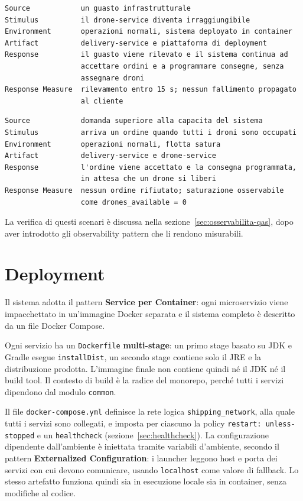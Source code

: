 \documentclass[12pt,a4paper]{article}
\begin{document}
\begin{lstlisting}[caption={QAS-A, Availability: guasto di un servizio a valle}]
Source            un guasto infrastrutturale
Stimulus          il drone-service diventa irraggiungibile
Environment       operazioni normali, sistema deployato in container
Artifact          delivery-service e piattaforma di deployment
Response          il guasto viene rilevato e il sistema continua ad
                  accettare ordini e a programmare consegne, senza
                  assegnare droni
Response Measure  rilevamento entro 15 s; nessun fallimento propagato
                  al cliente
\end{lstlisting}

\begin{lstlisting}[caption={QAS-B, Saturazione: flotta di droni esaurita}]
Source            domanda superiore alla capacita del sistema
Stimulus          arriva un ordine quando tutti i droni sono occupati
Environment       operazioni normali, flotta satura
Artifact          delivery-service e drone-service
Response          l'ordine viene accettato e la consegna programmata,
                  in attesa che un drone si liberi
Response Measure  nessun ordine rifiutato; saturazione osservabile
                  come drones_available = 0
\end{lstlisting}

La verifica di questi scenari \`e discussa nella sezione~\ref{sec:osservabilita-qas}, dopo aver
introdotto gli observability pattern che li rendono misurabili.

\section{Deployment}

Il sistema adotta il pattern \textbf{Service per Container}: ogni microservizio viene impacchettato
in un'immagine Docker separata e il sistema completo \`e descritto da un file Docker Compose.

Ogni servizio ha un \texttt{Dockerfile} \textbf{multi-stage}: un primo stage basato su JDK e Gradle
esegue \texttt{installDist}, un secondo stage contiene solo il JRE e la distribuzione prodotta.
L'immagine finale non contiene quindi n\'e il JDK n\'e il build tool. Il contesto di build \`e la
radice del monorepo, perch\'e tutti i servizi dipendono dal modulo \texttt{common}.

Il file \texttt{docker-compose.yml} definisce la rete logica \texttt{shipping\_network}, alla quale
tutti i servizi sono collegati, e imposta per ciascuno la policy \texttt{restart: unless-stopped} e
un \texttt{healthcheck} (sezione~\ref{sec:healthcheck}). La configurazione dipendente dall'ambiente
\`e iniettata tramite variabili d'ambiente, secondo il pattern \textbf{Externalized Configuration}:
i launcher leggono host e porta dei servizi con cui devono comunicare, usando \texttt{localhost}
come valore di fallback. Lo stesso artefatto funziona quindi sia in esecuzione locale sia in
container, senza modifiche al codice.
\end{document}
